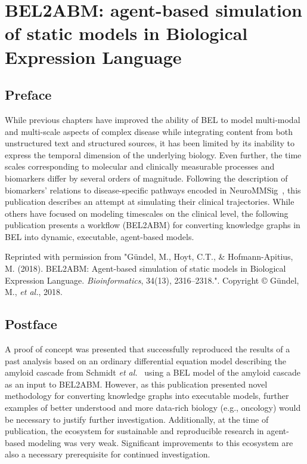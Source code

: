 \chapter{BEL2ABM: agent-based simulation of static models in Biological Expression Language}
\label{ch:bel2abm}

\section*{Preface}

While previous chapters have improved the ability of \ac{BEL} to model multi-modal and multi-scale aspects of complex disease while integrating content from both unstructured text and structured sources, it has been limited by its inability to express the temporal dimension of the underlying biology.
Even further, the time scales corresponding to molecular and clinically measurable processes and biomarkers differ by several orders of magnitude.
Following the description of biomarkers' relations to disease-specific pathways encoded in NeuroMMSig~\cite{Domingo-Fernandez2017}, this publication describes an attempt at simulating their clinical trajectories.
While others have focused on modeling timescales on the clinical level, the following publication presents a workflow (BEL2ABM) for converting knowledge graphs in \ac{BEL} into dynamic, executable, agent-based models.

\vspace*{\fill}

Reprinted with permission from "Gündel, M., Hoyt, C.T., \& Hofmann-Apitius, M. (2018). BEL2ABM: Agent-based simulation of static models in Biological Expression Language. \textit{Bioinformatics}, 34(13), 2316–2318.".
Copyright © Gündel, M., \textit{et al.}, 2018.



\section*{Postface}

A proof of concept was presented that successfully reproduced the results of a past analysis based on an ordinary differential equation model describing the amyloid cascade from Schmidt \textit{et al.}~\cite{Schmidt2012} using a \ac{BEL} model of the amyloid cascade as an input to BEL2ABM\@.
However, as this publication presented novel methodology for converting knowledge graphs into executable models, further examples of better understood and more data-rich biology (e.g., oncology) would be necessary to justify further investigation.
Additionally, at the time of publication, the ecosystem for sustainable and reproducible research in agent-based modeling was very weak.
Significant improvements to this ecosystem are also a necessary prerequisite for continued investigation.

